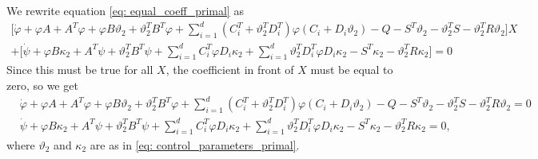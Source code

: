 We rewrite equation \eqref{eq: equal_coeff_primal} as
\begin{align*}
    \bigg[\dot{\varphi} + \varphi A + A^T \varphi + \varphi B \vartheta_2 + \vartheta_2^T B^T \varphi + \sum_{i=1}^d (C_i^T + \vartheta_2^T D_i^T) \varphi (C_i + D_i \vartheta_2) - Q - S^T \vartheta_2 - \vartheta_2^T S - \vartheta_2^T R \vartheta_2\bigg]X  \\
    + \big[ \dot{\psi} + \varphi B \kappa_2 + A^T \psi + \vartheta_2^T B^T \psi + \sum_{i=1}^d C_i^T \varphi D_i \kappa_2 + \sum_{i=1}^d \vartheta_2^T D_i^T \varphi D_i \kappa_2 - S^T \kappa_2 - \vartheta_2^T R \kappa_2 \big]= 0
\end{align*}
Since this must be true for all $X$, the coefficient in front of $X$ must be equal to zero, so we get 
\begin{align}
    &\dot{\varphi} + \varphi A + A^T \varphi + \varphi B \vartheta_2 + \vartheta_2^T B^T \varphi + \sum_{i=1}^d (C_i^T + \vartheta_2^T D_i^T) \varphi (C_i + D_i \vartheta_2) - Q - S^T \vartheta_2 - \vartheta_2^T S - \vartheta_2^T R \vartheta_2  = 0  \label{eq: primal_bsde_solution_1}\\
    &\dot{\psi} + \varphi B \kappa_2 + A^T \psi + \vartheta_2^T B^T \psi + \sum_{i=1}^d C_i^T \varphi D_i \kappa_2 + \sum_{i=1}^d \vartheta_2^T D_i^T \varphi D_i \kappa_2 - S^T \kappa_2 - \vartheta_2^T R \kappa_2 = 0, \label{eq: primal_bsde_solution_2}
\end{align}
where $\vartheta_2$ and $\kappa_2$ are as in \eqref{eq: control_parameters_primal}.




